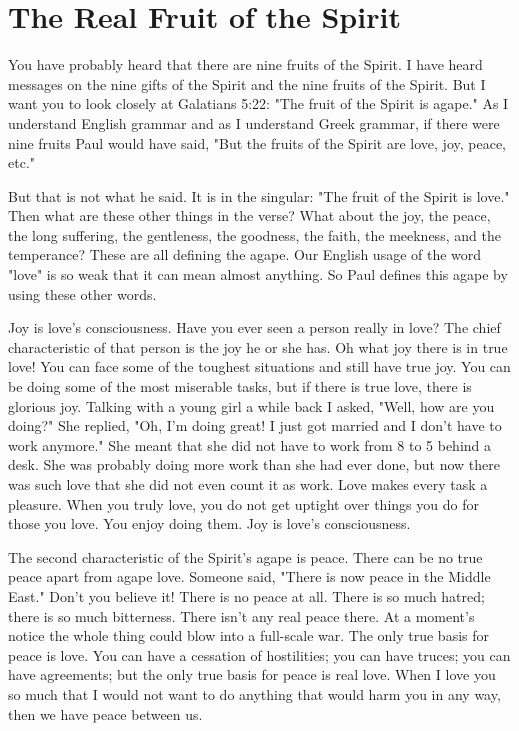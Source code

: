 \section*{The Real Fruit of the Spirit}

You have probably heard that there are nine fruits of the Spirit. I have heard messages on the nine gifts of the Spirit and the nine fruits of the Spirit. But I want you to look closely at Galatians 5:22: "The fruit of the Spirit is agape." As I understand English grammar and as I understand Greek grammar, if there were nine fruits Paul would have said, "But the fruits of the Spirit are love, joy, peace, etc." 

But that is not what he said. It is in the singular: "The fruit of the Spirit is love." Then what are these other things in the verse? What about the joy, the peace, the long suffering, the gentleness, the goodness, the faith, the meekness, and the temperance? These are all defining the agape. Our English usage of the word "love" is so weak that it can mean almost anything. So Paul defines this agape by using these other words. 

Joy is love's consciousness. Have you ever seen a person really in love? The chief characteristic of that person is the joy he or she has. Oh what joy there is in true love! You can face some of the toughest situations and still have true joy. You can be doing some of the most miserable tasks, but if there is true love, there is glorious joy. Talking with a young girl a while back I asked, "Well, how are you doing?" She replied, "Oh, I'm doing great! I just got married and I don't have to work anymore." She meant that she did not have to work from 8 to 5 behind a desk. She was probably doing more work than she had ever done, but now there was such love that she did not even count it as work. Love makes every task a pleasure. When you truly love, you do not get uptight over things you do for those you love. You enjoy doing them. Joy is love's consciousness. 

The second characteristic of the Spirit's agape is peace. There can be no true peace apart from agape love. Someone said, "There is now peace in the Middle East." Don't you believe it! There is no peace at all. There is so much hatred; there is so much bitterness. There isn't any real peace there. At a moment's notice the whole thing could blow into a full-scale war. The only true basis for peace is love. You can have a cessation of hostilities; you can have truces; you can have agreements; but the only true basis for peace is real love. When I love you so much that I would not want to do anything that would harm you in any way, then we have peace between us. 

